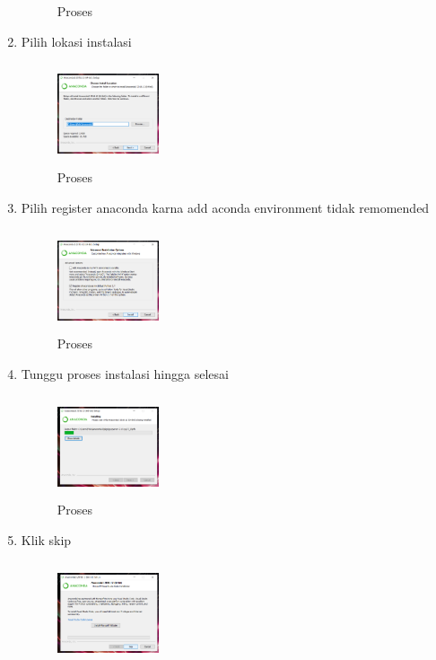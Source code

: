 \begin{enumerate}
\begin{figure}[!htbp]
        \caption{Proses}
        \label{awal}
        \end{figure}
    \item  Pilih lokasi instalasi
    \begin{figure}[!htbp]
        \centering
        \includegraphics[width=3cm,height=3cm]{figures/jonviter/4.png}
        \caption{Proses}
        \label{awal}
        \end{figure}
    \item Pilih register anaconda karna add aconda environment tidak remomended
    \begin{figure}[!htbp]
        \centering
        \includegraphics[width=3cm,height=3cm]{figures/jonviter/5.png}
        \caption{Proses}
        \label{awal}
        \end{figure}
    \item Tunggu proses instalasi hingga selesai
    \begin{figure}[!htbp]
        \centering
        \includegraphics[width=3cm,height=3cm]{figures/jonviter/6.png}
        \caption{Proses}
        \label{awal}
        \end{figure}
    \item Klik skip
    \begin{figure}[!htbp]
        \centering
        \includegraphics[width=3cm,height=3cm]{figures/jonviter/8.png}

\end{figure}
\end{enumerate}
